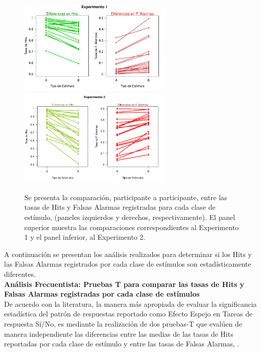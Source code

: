 \begin{figure}[th]
\centering
\includegraphics[width=0.65\textwidth]{Figures/Diff_Rate_E1}\\ 
\includegraphics[width=0.65\textwidth]{Figures/Diff_Rate_E2}\\
\caption[Diferencias entre las Tasas de Hits y Falsas Alarmas registradas en cada clase de estímulos]{Se presenta la comparación, participante a participante, entre las tasas de Hits y Falsas Alarmas registradas para cada clase de estímulo, (paneles izquierdos y derechos, respectivamente). El panel superior muestra las comparaciones correspondientes al Experimento 1 y el panel inferior, al Experimento 2.}
\label{fig:Diff_Rate}
\end{figure}

A continuación se presentan los análisis realizados para determinar si los Hits y las Falsas Alarmas registrados por cada clase de estímulos son estadísticamente diferentes.\\

\textbf{Análisis Frecuentista: Pruebas T para comparar las tasas de Hits y Falsas Alarmas registradas por cada clase de estímulos}\\

De acuerdo con la literatura, la manera más apropiada de evaluar la significancia estadística del patrón de respuestas reportado como Efecto Espejo en Tareas de respuesta Sí/No, es mediante la realización de dos pruebas-T que evalúen de manera independiente las diferencias entre las medias de las tasas de Hits reportadas por cada clase de estímulo y entre las tasas de Falsas Alarmas, \parencite{Glanzer1990}.\\

